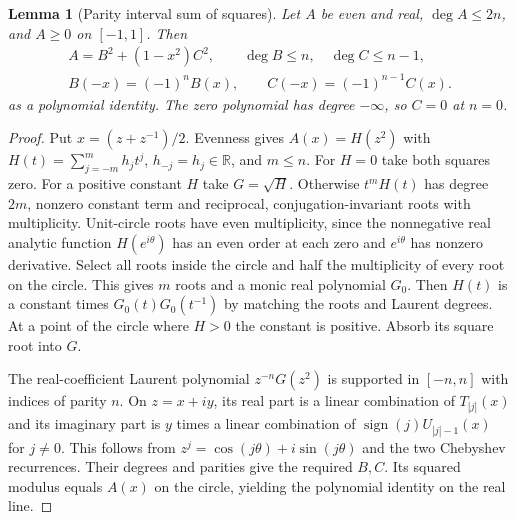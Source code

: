 \documentclass[11pt,reqno]{amsart}
\newtheorem{lemma}[theorem]{Lemma}
\theoremstyle{definition}
\theoremstyle{remark}
\numberwithin{equation}{section}
\newcommand{\R}{\mathbb{R}}
\begin{document}
\begin{lemma}[Parity interval sum of squares]\label{m4:sos}
Let $A$ be even and real, $\deg A\le2n$, and $A\ge0$ on $[-1,1]$. Then
\[
 \begin{gathered}
 A=B^2+(1-x^2)C^2,\qquad \deg B\le n,\quad \deg C\le n-1,\\
 B(-x)=(-1)^nB(x),\qquad C(-x)=(-1)^{n-1}C(x).
 \end{gathered}
\]
as a polynomial identity. The zero polynomial has degree $-\infty$, so $C=0$ at $n=0$.
\end{lemma}
\begin{proof}
Put $x=(z+z^{-1})/2$. Evenness gives $A(x)=H(z^2)$ with $H(t)=\sum_{j=-m}^{m}h_jt^j$, $h_{-j}=h_j\in\R$, and $m\le n$. For $H=0$ take both squares zero. For a positive constant $H$ take $G=\sqrt H$. Otherwise $t^mH(t)$ has degree $2m$, nonzero constant term and reciprocal, conjugation-invariant roots with multiplicity. Unit-circle roots have even multiplicity, since the nonnegative real analytic function $H(e^{i\theta})$ has an even order at each zero and $e^{i\theta}$ has nonzero derivative. Select all roots inside the circle and half the multiplicity of every root on the circle. This gives $m$ roots and a monic real polynomial $G_0$. Then $H(t)$ is a constant times $G_0(t)G_0(t^{-1})$ by matching the roots and Laurent degrees. At a point of the circle where $H>0$ the constant is positive. Absorb its square root into $G$.

The real-coefficient Laurent polynomial $z^{-n}G(z^2)$ is supported in $[-n,n]$ with indices of parity $n$. On $z=x+iy$, its real part is a linear combination of $T_{|j|}(x)$ and its imaginary part is $y$ times a linear combination of $\operatorname{sign}(j)U_{|j|-1}(x)$ for $j\ne0$. This follows from $z^j=\cos(j\theta)+i\sin(j\theta)$ and the two Chebyshev recurrences. Their degrees and parities give the required $B,C$. Its squared modulus equals $A(x)$ on the circle, yielding the polynomial identity on the real line.
\end{proof}
\end{document}
